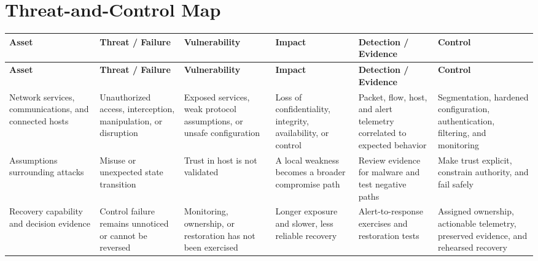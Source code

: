 \documentclass[11pt,letterpaper]{article}
\begin{document}
\section*{Threat-and-Control Map}
\begingroup\scriptsize\setlength{\tabcolsep}{2pt}
\begin{longtable}{>{\raggedright\arraybackslash}p{}>{\raggedright\arraybackslash}p{}>{\raggedright\arraybackslash}p{}>{\raggedright\arraybackslash}p{}>{\raggedright\arraybackslash}p{}>{\raggedright\arraybackslash}p{}}
\toprule\rowcolor{Navy}\color{white}\textbf{Asset} & \color{white}\textbf{Threat / Failure} & \color{white}\textbf{Vulnerability} & \color{white}\textbf{Impact} & \color{white}\textbf{Detection / Evidence} & \color{white}\textbf{Control}\\\midrule
\endfirsthead
\toprule\rowcolor{Navy}\color{white}\textbf{Asset} & \color{white}\textbf{Threat / Failure} & \color{white}\textbf{Vulnerability} & \color{white}\textbf{Impact} & \color{white}\textbf{Detection / Evidence} & \color{white}\textbf{Control}\\\midrule
\endhead
Network services, communications, and connected hosts & Unauthorized access, interception, manipulation, or disruption & Exposed services, weak protocol assumptions, or unsafe configuration & Loss of confidentiality, integrity, availability, or control & Packet, flow, host, and alert telemetry correlated to expected behavior & Segmentation, hardened configuration, authentication, filtering, and monitoring\\\midrule
Assumptions surrounding attacks & Misuse or unexpected state transition & Trust in host is not validated & A local weakness becomes a broader compromise path & Review evidence for malware and test negative paths & Make trust explicit, constrain authority, and fail safely\\\midrule
Recovery capability and decision evidence & Control failure remains unnoticed or cannot be reversed & Monitoring, ownership, or restoration has not been exercised & Longer exposure and slower, less reliable recovery & Alert-to-response exercises and restoration tests & Assigned ownership, actionable telemetry, preserved evidence, and rehearsed recovery\\\midrule
\bottomrule
\end{longtable}
\endgroup
\end{document}
